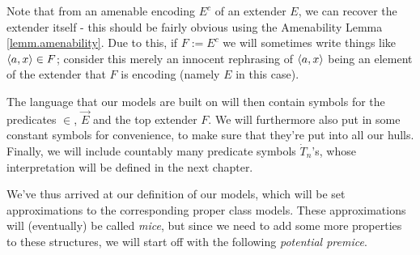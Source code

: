 

Note that from an amenable encoding $E^c$ of an extender $E$, we can recover the extender itself - this should be fairly obvious using the Amenability Lemma \ref{lemm.amenability}. Due to this, if $F:=E^c$ we will sometimes write things like $\langle a,x\rangle\in F$; consider this merely an innocent rephrasing of $\langle a,x\rangle$ being an element of the extender that $F$ is encoding (namely $E$ in this case).

\qquad The language that our models are built on will then contain symbols for the predicates $\in$, $\vec E$ and the top extender $F$. We will furthermore also put in some constant symbols for convenience, to make sure that they're put into all our hulls. Finally, we will include countably many predicate symbols $\dot T_n$'s, whose interpretation will be defined in the next chapter.


We've thus arrived at our definition of our models, which will be set approximations to the corresponding proper class models. These approximations will (eventually) be called \textit{mice}, but since we need to add some more properties to these structures, we will start off with the following \textit{potential premice}.

